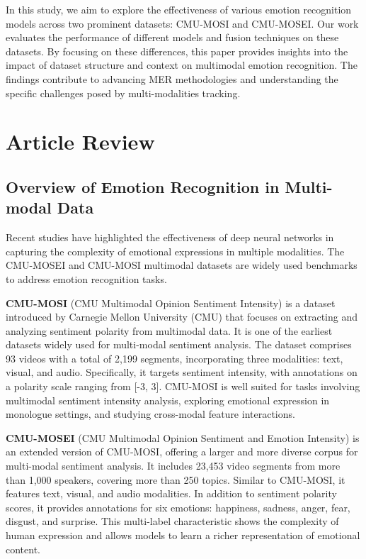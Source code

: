 \documentclass{article}
\begin{document}
In this study, we aim to explore the effectiveness of various emotion recognition models across two prominent datasets: CMU-MOSI and CMU-MOSEI. Our work evaluates the performance of different models and fusion techniques on these datasets. By focusing on these differences, this paper provides insights into the impact of dataset structure and context on multimodal emotion recognition. The findings contribute to advancing MER methodologies and understanding the specific challenges posed by multi-modalities tracking.

\section{Article Review}
\subsection{Overview of Emotion Recognition in Multi-modal Data}
Recent studies have highlighted the effectiveness of deep neural networks in capturing the complexity of emotional expressions in multiple modalities. The CMU-MOSEI\cite{bagher-zadeh-etal-2018-multimodal} and CMU-MOSI\cite{Zadeh2016MOSIMC} multimodal datasets are widely used benchmarks to address emotion recognition tasks.

\textbf{CMU-MOSI} (CMU Multimodal Opinion Sentiment Intensity) is a dataset introduced by Carnegie Mellon University (CMU) that focuses on extracting and analyzing sentiment polarity from multimodal data. It is one of the earliest datasets widely used for multi-modal sentiment analysis. The dataset comprises 93 videos with a total of 2,199 segments, incorporating three modalities: text, visual, and audio. Specifically, it targets sentiment intensity, with annotations on a polarity scale ranging from [-3, 3]. CMU-MOSI is well suited for tasks involving multimodal sentiment intensity analysis, exploring emotional expression in monologue settings, and studying cross-modal feature interactions.

\textbf{CMU-MOSEI} (CMU Multimodal Opinion Sentiment and Emotion Intensity) is an extended version of CMU-MOSI, offering a larger and more diverse corpus for multi-modal sentiment analysis. It includes 23,453 video segments from more than 1,000 speakers, covering more than 250 topics. Similar to CMU-MOSI, it features text, visual, and audio modalities. In addition to sentiment polarity scores, it provides annotations for six emotions: happiness, sadness, anger, fear, disgust, and surprise. This multi-label characteristic shows the complexity of human expression and allows models to learn a richer representation of emotional content.
\end{document}
